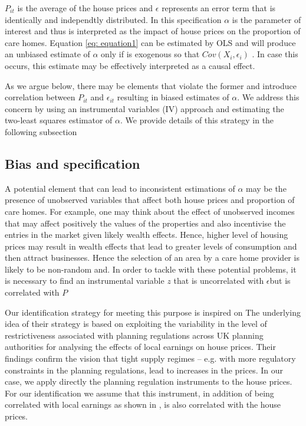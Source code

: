 \documentclass[12pt,letterpaper]{article}
\begin{document}
       
       
       $P_{it}$ is the average of the house prices and $\epsilon$
       represents an error term that is identically and independtly distributed. In this specification $\alpha$ is the 
       parameter of interest and thus is interpreted as the impact of house prices on the proportion 
       of care homes. Equation \ref{eq: equation1} can be estimated by OLS and will produce an unbiased estimate of $\alpha$ only if
         is exogenous so that $Cov(X_{i}, \epsilon_{i})$ . In case this occurs, this estimate may be effectively interpreted as
          a causal effect. 
          
 As we argue below, there may be elements that violate the former and introduce correlation between $P_{it}$ and
 $\epsilon_{it}$ resulting in biased estimates of $\alpha$. We address this concern by using an instrumental
  variables (IV) approach and estimating the two-least squares estimator of $\alpha$. We provide details of this
   strategy in the following subsection 
   
   \subsection{Bias and specification}
   
A potential element that can lead to inconsistent estimations of $\alpha$ may be the presence of unobserved
 variables that affect both house prices and proportion of care homes. For example, one may think about
  the effect of unobserved incomes that may affect positively the values of the properties and also incentivise
   the entries in the market given likely wealth effects. Hence, higher level of housing prices may result in
    wealth effects that lead to greater levels of consumption and then attract businesses. Hence the selection
     of an area by a care home provider is likely to be non-random and. In order to tackle with these potential
      problems, it is necessary to find an instrumental variable $z$  that is uncorrelated with $\epsilon$but is correlated
       with $P$
   
Our identification strategy for meeting this purpose is inspired on \citet{hilber2016supply}
The underlying idea of their strategy is based on exploiting the variability in the level of restrictiveness 
associated with planning regulations across UK planning authorities for analysing the effects of local earnings
 on house prices. Their findings confirm the vision that tight supply regimes – e.g. with more regulatory 
 constraints in the planning regulations, lead to increases in the prices. In our case, we apply directly 
 the planning regulation instruments to the house prices. For our identification we assume that this instrument,
  in addition of being correlated with local earnings as shown in 
  \citet{hilber2016supply}, is also correlated with the house prices. 
  
\end{document}
